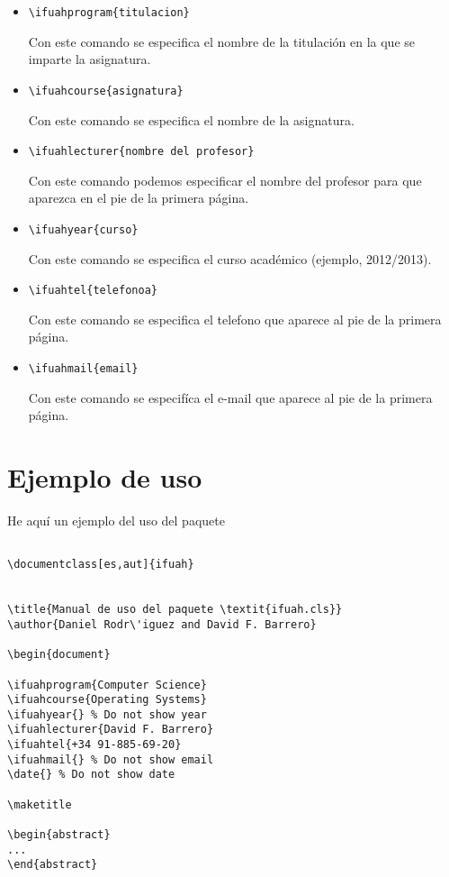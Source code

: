 \documentclass[es,aut]{ifuah}
\begin{document}
\begin{itemize}
\item \begin{verbatim}\ifuahprogram{titulacion}\end{verbatim} Con este comando se especifica el nombre de la titulaci\'on en la que se imparte la asignatura.
\item \begin{verbatim}\ifuahcourse{asignatura}\end{verbatim} Con este comando se especifica el nombre de la asignatura.
\item \begin{verbatim}\ifuahlecturer{nombre del profesor}\end{verbatim} Con este comando podemos especificar el nombre del profesor para que aparezca en el pie de la primera p\'agina.
\item \begin{verbatim}\ifuahyear{curso}\end{verbatim} Con este comando se especifica el curso acad\'emico (ejemplo, 2012/2013).
\item \begin{verbatim}\ifuahtel{telefonoa}\end{verbatim} Con este comando se especifica el telefono que aparece al pie de la primera p\'agina.
\item \begin{verbatim}\ifuahmail{email}\end{verbatim} Con este comando se especif\'ica el e-mail que aparece al pie de la primera p\'agina.
\end{itemize}

\section{Ejemplo de uso}

He aqu\'i un ejemplo del uso del paquete

\begin{verbatim}

\documentclass[es,aut]{ifuah}


\title{Manual de uso del paquete \textit{ifuah.cls}}
\author{Daniel Rodr\'iguez and David F. Barrero}

\begin{document}

\ifuahprogram{Computer Science}
\ifuahcourse{Operating Systems}
\ifuahyear{} % Do not show year
\ifuahlecturer{David F. Barrero}
\ifuahtel{+34 91-885-69-20}
\ifuahmail{} % Do not show email
\date{} % Do not show date

\maketitle

\begin{abstract}
...
\end{abstract}

\end{verbatim}
\end{document}
